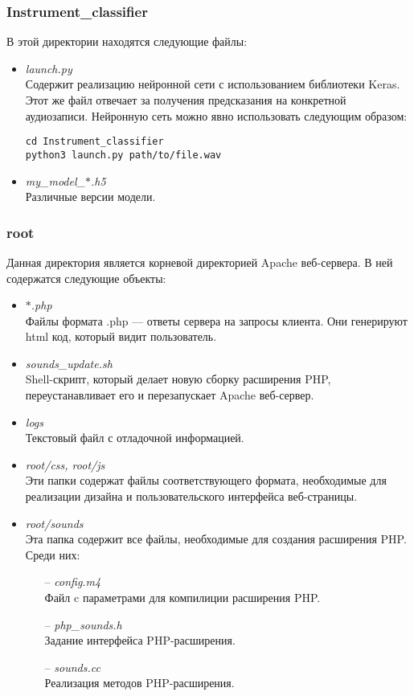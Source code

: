\documentclass[14pt,a4paper]{article}
\begin{document}
\subsubsection*{Instrument\_classifier}
\lstset{
  language=bash,
  basicstyle=\ttfamily
}

В этой директории находятся следующие файлы:
\begin{itemize}
\item \textit{launch.py} \\
Содержит реализацию нейронной сети с использованием библиотеки Keras. Этот же файл отвечает за получения предсказания на конкретной аудиозаписи. Нейронную сеть можно явно использовать следующим образом:
\begin{lstlisting}
cd Instrument_classifier
python3 launch.py path/to/file.wav
\end{lstlisting}
\item \textit{my\_model\_$\ast$.h5} \\
Различные версии модели.
\end{itemize}

\subsubsection*{root}

Данная директория является корневой директорией Apache веб-сервера. В ней содержатся следующие объекты:
\begin{itemize}
\item \textit{$\ast$.php} \\
Файлы формата .php --- ответы сервера на запросы клиента. Они генерируют html код, который видит пользователь.
\item \textit{sounds\_update.sh} \\
Shell-скрипт, который делает новую сборку расширения PHP, переустанавливает его и перезапускает Apache веб-сервер.
\item \textit{logs} \\
Текстовый файл с отладочной информацией.
\item \textit{root/css, root/js} \\
Эти папки содержат файлы соответствующего формата, необходимые для реализации дизайна и пользовательского интерфейса веб-страницы.
\item \textit{root/sounds} \\
Эта папка содержит все файлы, необходимые для создания расширения PHP. Среди них:
    \begin{itemize}
    \item[--] \textit{config.m4} \\
    Файл c параметрами для компилиции расширения PHP.
    \item[--] \textit{php\_sounds.h} \\
    Задание интерфейса PHP-расширения.
    \item[--] \textit{sounds.cc} \\
    Реализация методов PHP-расширения.
    \end{itemize}
\end{itemize}
\end{document}
